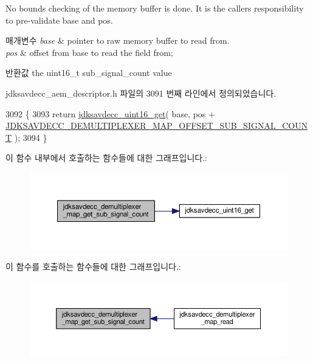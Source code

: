 No bounds checking of the memory buffer is done. It is the caller\textquotesingle{}s responsibility to pre-\/validate base and pos.


\begin{DoxyParams}{매개변수}
{\em base} & pointer to raw memory buffer to read from. \\
\hline
{\em pos} & offset from base to read the field from; \\
\hline
\end{DoxyParams}
\begin{DoxyReturn}{반환값}
the uint16\+\_\+t sub\+\_\+signal\+\_\+count value 
\end{DoxyReturn}


jdksavdecc\+\_\+aem\+\_\+descriptor.\+h 파일의 3091 번째 라인에서 정의되었습니다.


\begin{DoxyCode}
3092 \{
3093     \textcolor{keywordflow}{return} \hyperlink{group__endian_ga3fbbbc20be954aa61e039872965b0dc9}{jdksavdecc\_uint16\_get}( base, pos + 
      \hyperlink{group__demultiplexer__map_gac0a7c761d3bd8bae0c6316b65a57e5df}{JDKSAVDECC\_DEMULTIPLEXER\_MAP\_OFFSET\_SUB\_SIGNAL\_COUNT} );
3094 \}
\end{DoxyCode}


이 함수 내부에서 호출하는 함수들에 대한 그래프입니다.\+:
\nopagebreak
\begin{figure}[H]
\begin{center}
\leavevmode
\includegraphics[width=350pt]{group__demultiplexer__map_gaaf0bb4a7ccfc5d5a2ae4cac02e854d8d_cgraph}
\end{center}
\end{figure}




이 함수를 호출하는 함수들에 대한 그래프입니다.\+:
\nopagebreak
\begin{figure}[H]
\begin{center}
\leavevmode
\includegraphics[width=350pt]{group__demultiplexer__map_gaaf0bb4a7ccfc5d5a2ae4cac02e854d8d_icgraph}
\end{center}
\end{figure}


